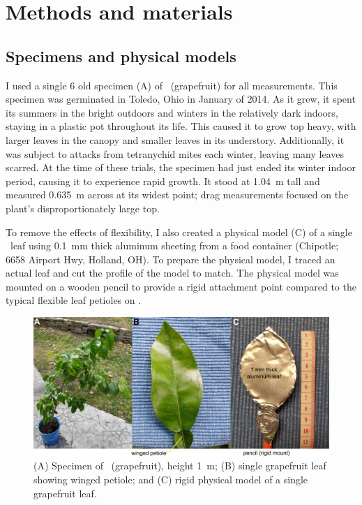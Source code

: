 \section{Methods and materials}
\label{sec:methods}

\subsection{Specimens and physical models}
I used a single \SI{6}{\year} old specimen (A) of \Citrusxparadisi\ (grapefruit) for all measurements. This specimen was germinated in Toledo, Ohio in January of 2014. As it grew, it spent its summers in the bright outdoors and winters in the relatively dark indoors, staying in a plastic pot throughout its life. This caused it to grow top heavy, with larger leaves in the canopy and smaller leaves in its understory. Additionally, it was subject to attacks from tetranychid mites each winter, leaving many leaves scarred. At the time of these trials, the specimen had just ended its winter indoor period, causing it to experience rapid growth. It stood at \SI{1.04}{\meter} tall and measured \SI{0.635}{\meter} across at its widest point; drag measurements focused on the plant's disproportionately large top.

To remove the effects of flexibility, I also created a physical model (C) of a single \Cxparadisi\ leaf using \SI{0.1}{\milli\meter} thick aluminum sheeting from a food container (Chipotle; 6658 Airport Hwy, Holland, OH). To prepare the physical model, I traced an actual leaf and cut the profile of the model to match. The physical model was mounted on a wooden pencil to provide a rigid attachment point compared to the typical flexible leaf petioles on \Cxparadisi. 
\begin{figure}
\begin{center}
\includegraphics[width=6in]{figures/fig1.png}
\end{center}
\caption{(A) Specimen of \Citrusxparadisi\ (grapefruit), height \SI{1}{\meter}; (B) single grapefruit leaf showing winged petiole; and (C) rigid physical model of a single grapefruit leaf.}
\label{fig:methods:specimens}
\end{figure}








